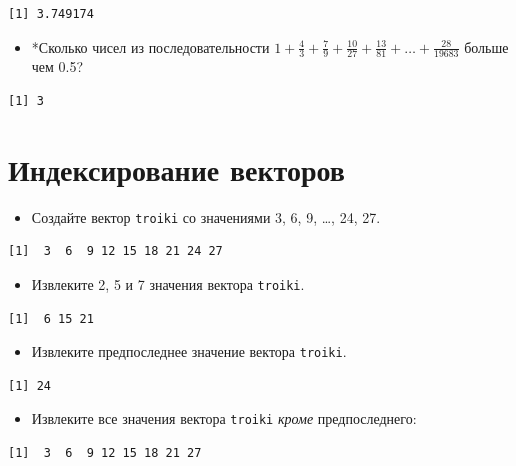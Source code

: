 \documentclass[
]{book}
\providecommand{\tightlist}{%
  \setlength{\itemsep}{0pt}\setlength{\parskip}{0pt}}
\begin{document}
\begin{verbatim}
[1] 3.749174
\end{verbatim}

\begin{itemize}
\tightlist
\item
  *Сколько чисел из последовательности \(1+\frac{4}{3}+\frac{7}{9}+\frac{10}{27}+\frac{13}{81}+\ldots+\frac{28}{19683}\) больше чем 0.5?
\end{itemize}

\begin{verbatim}
[1] 3
\end{verbatim}

\hypertarget{task_vec_ind}{%
\section{Индексирование векторов}\label{task_vec_ind}}

\begin{itemize}
\tightlist
\item
  Создайте вектор \texttt{troiki} со значениями 3, 6, 9, \ldots, 24, 27.
\end{itemize}

\begin{verbatim}
[1]  3  6  9 12 15 18 21 24 27
\end{verbatim}

\begin{itemize}
\tightlist
\item
  Извлеките 2, 5 и 7 значения вектора \texttt{troiki}.
\end{itemize}

\begin{verbatim}
[1]  6 15 21
\end{verbatim}

\begin{itemize}
\tightlist
\item
  Извлеките предпоследнее значение вектора \texttt{troiki}.
\end{itemize}

\begin{verbatim}
[1] 24
\end{verbatim}

\begin{itemize}
\tightlist
\item
  Извлеките все значения вектора \texttt{troiki} \emph{кроме} предпоследнего:
\end{itemize}

\begin{verbatim}
[1]  3  6  9 12 15 18 21 27
\end{verbatim}
\end{document}
